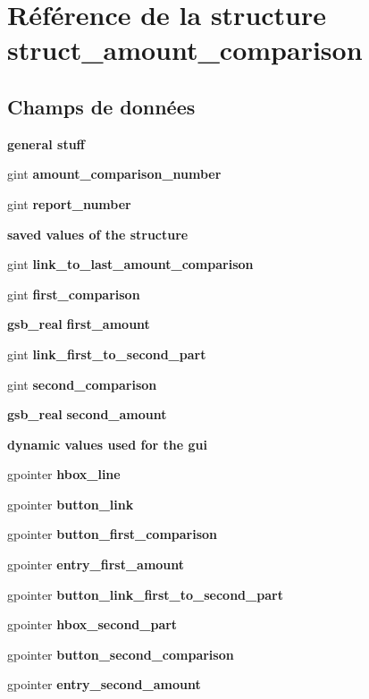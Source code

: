 \section{Référence de la structure struct\_\-amount\_\-comparison}
\label{structstruct__amount__comparison}
\subsection*{Champs de données}
\begin{Indent}{\bf general stuff}\par
{\em \label{_amgrp52b07cac44d92ce9f787d506234f1ad4}
 }\begin{DoxyCompactItemize}
\item 
gint {\bf amount\_\-comparison\_\-number}
\item 
gint {\bf report\_\-number}
\end{DoxyCompactItemize}
\end{Indent}
\begin{Indent}{\bf saved values of the structure}\par
{\em \label{_amgrp82e82302acb5acd2c4ecfd61e3ccfadc}
 }\begin{DoxyCompactItemize}
\item 
gint {\bf link\_\-to\_\-last\_\-amount\_\-comparison}
\item 
gint {\bf first\_\-comparison}
\item 
{\bf gsb\_\-real} {\bf first\_\-amount}
\item 
gint {\bf link\_\-first\_\-to\_\-second\_\-part}
\item 
gint {\bf second\_\-comparison}
\item 
{\bf gsb\_\-real} {\bf second\_\-amount}
\end{DoxyCompactItemize}
\end{Indent}
\begin{Indent}{\bf dynamic values used for the gui}\par
{\em \label{_amgrpfa4c276376680d85120c0744b7f95e25}
 }\begin{DoxyCompactItemize}
\item 
gpointer {\bf hbox\_\-line}
\item 
gpointer {\bf button\_\-link}
\item 
gpointer {\bf button\_\-first\_\-comparison}
\item 
gpointer {\bf entry\_\-first\_\-amount}
\item 
gpointer {\bf button\_\-link\_\-first\_\-to\_\-second\_\-part}
\item 
gpointer {\bf hbox\_\-second\_\-part}
\item 
gpointer {\bf button\_\-second\_\-comparison}
\item 
gpointer {\bf entry\_\-second\_\-amount}
\end{DoxyCompactItemize}
\end{Indent}


